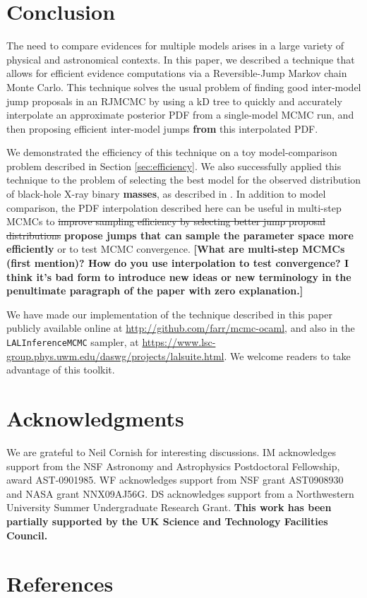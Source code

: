 \documentclass{iopart}
\newcommand{\ilya}[1]{{\color{red} \bf #1}}
\begin{document}
\section{Conclusion}
\label{sec:conclusion}

The need to compare evidences for multiple models arises in a large
variety of physical and astronomical contexts.  In this paper, we
described a technique that allows for efficient evidence
computations via a Reversible-Jump Markov chain Monte Carlo.  This
technique solves the usual problem of finding good inter-model jump
proposals in an RJMCMC by using a kD tree to quickly and accurately
interpolate an approximate posterior PDF from a single-model MCMC run,
and then proposing efficient inter-model
jumps \ilya{from} this interpolated PDF.

We demonstrated the efficiency of this technique on a toy
model-comparison problem described in Section \ref{sec:efficiency}.
We also successfully applied this technique to the problem of
selecting the best model for the observed distribution of black-hole
X-ray binary \ilya{masses}, as described in \cite{Farr2010}.  In addition to
model comparison, the PDF interpolation described here can be useful
in multi-step MCMCs to \sout{improve sampling efficiency by selecting
better jump proposal distributions} \ilya{propose jumps that can sample the parameter space more efficiently} or to test MCMC convergence. \ilya{[What are multi-step MCMCs (first mention)?  How do you use interpolation to test convergence?  I think it's bad form to introduce new ideas or new terminology in the penultimate paragraph of the paper with zero explanation.]}

We have made our implementation of the technique described in this
paper publicly available online at
\url{http://github.com/farr/mcmc-ocaml}, and also in the
\texttt{LALInferenceMCMC} sampler, at
\url{https://www.lsc-group.phys.uwm.edu/daswg/projects/lalsuite.html}.
We welcome readers to take advantage of this toolkit.


\section*{Acknowledgments}

We are grateful to Neil Cornish for interesting discussions.  IM
acknowledges support from the NSF Astronomy and Astrophysics
Postdoctoral Fellowship, award AST-0901985.  WF acknowledges support
from NSF grant AST0908930 and NASA grant NNX09AJ56G. DS acknowledges
support from a Northwestern University Summer Undergraduate Research Grant.  \ilya{This work has been partially supported by the UK Science and Technology Facilities Council.}

\section*{References}


%
\end{document}
